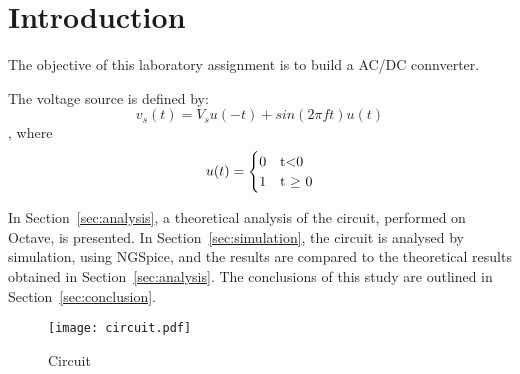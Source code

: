 \section{Introduction}
\label{sec:introduction}
The objective of this laboratory assignment is to build a AC/DC connverter. 



\par The voltage source is defined by:
\begin{equation}
v_s(t) = V_s u(-t) + sin(2 \pi f t)u(t)
\label {equation:voltsource}
\end{equation}
, where
\begin{equation}
u(t)=
\begin{cases}
0 & $t$ < $0$ \\
1 & $t $\geq$ 0$
\end{cases}
\label {eq:ut}
\end{equation}

In Section~\ref{sec:analysis}, a theoretical analysis of the circuit, 
performed on Octave, is presented. In Section~\ref{sec:simulation}, the 
circuit is analysed by simulation, using NGSpice, and the results are compared to 
the theoretical results obtained in Section~\ref{sec:analysis}. The conclusions 
of this study are outlined in Section~\ref{sec:conclusion}.

\begin{figure}[H] \centering
\texttt{[image: circuit.pdf]}
\caption{Circuit }                                     %
\label{fig:circuit}
\end{figure}

